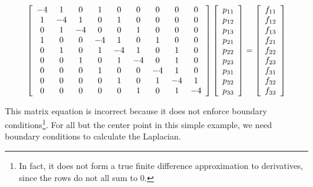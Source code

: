 \documentclass[12pt]{article}
\begin{document}
\[ \left[ \begin{array}{c c c c c c c c c} 
-4&1&0&1&0&0&0&0&0\\ 
1&-4&1&0&1&0&0&0&0\\ 
0&1&-4&0&0&1&0&0&0\\ 
1&0&0&-4&1&0&1&0&0\\ 
0&1&0&1&-4&1&0&1&0 \\ 
0&0&1&0&1&-4&0&1&0\\ 
0&0&0&1&0&0&-4&1&0\\ 
0&0&0&0&1&0&1&-4&1\\ 
0&0&0&0&0&1&0&1&-4\\ \end{array} \right] \left[ \begin{array}{c} p_{11}\\p_{12}\\p_{13}\\p_{21}\\p_{22}\\p_{23}\\p_{31}\\p_{32}\\p_{33}\\ \end{array}\right] = \left[ \begin{array}{c} f_{11}\\f_{12}\\f_{13}\\f_{21}\\f_{22}\\f_{23}\\f_{31}\\f_{32}\\f_{33}\\ \end{array}\right]
\]

This matrix equation is incorrect because it does not enforce boundary conditions\footnote{In fact, it does not form a true finite difference approximation to derivatives, since the rows do not all sum to 0.}. For all but the center point in this simple example, we need boundary conditions to calculate the Laplacian.  
\end{document}
